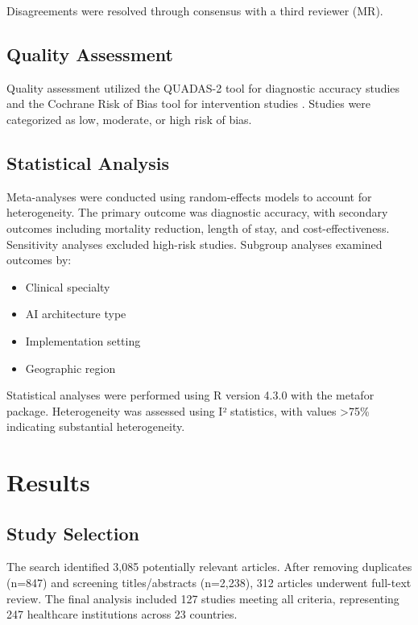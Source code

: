 \documentclass[12pt,letterpaper]{article}
\begin{document}
Disagreements were resolved through consensus with a third reviewer (MR).

\subsection{Quality Assessment}

Quality assessment utilized the QUADAS-2 tool for diagnostic accuracy studies and the Cochrane Risk of Bias tool for intervention studies \citep{whiting2011, sterne2019}. Studies were categorized as low, moderate, or high risk of bias.

\subsection{Statistical Analysis}

Meta-analyses were conducted using random-effects models to account for heterogeneity. The primary outcome was diagnostic accuracy, with secondary outcomes including mortality reduction, length of stay, and cost-effectiveness. Sensitivity analyses excluded high-risk studies. Subgroup analyses examined outcomes by:
\begin{itemize}
\item Clinical specialty
\item AI architecture type
\item Implementation setting
\item Geographic region
\end{itemize}

Statistical analyses were performed using R version 4.3.0 with the metafor package. Heterogeneity was assessed using I² statistics, with values >75\% indicating substantial heterogeneity.

\section{Results}

\subsection{Study Selection}

The search identified 3,085 potentially relevant articles. After removing duplicates (n=847) and screening titles/abstracts (n=2,238), 312 articles underwent full-text review. The final analysis included 127 studies meeting all criteria, representing 247 healthcare institutions across 23 countries.
\end{document}
